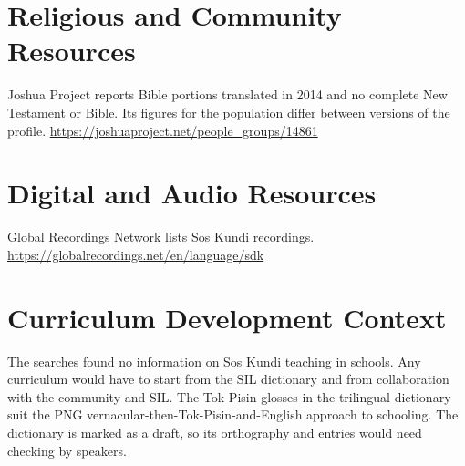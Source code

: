 \documentclass[12pt]{article}
\begin{document}
\section{Religious and Community Resources}
Joshua Project reports Bible portions translated in 2014 and no complete New Testament or Bible. Its figures for the population differ between versions of the profile. \url{https://joshuaproject.net/people_groups/14861}

\section{Digital and Audio Resources}
Global Recordings Network lists Sos Kundi recordings. \url{https://globalrecordings.net/en/language/sdk}

\section{Curriculum Development Context}
The searches found no information on Sos Kundi teaching in schools. Any curriculum would have to start from the SIL dictionary and from collaboration with the community and SIL. The Tok Pisin glosses in the trilingual dictionary suit the PNG vernacular-then-Tok-Pisin-and-English approach to schooling. The dictionary is marked as a draft, so its orthography and entries would need checking by speakers.
\end{document}
